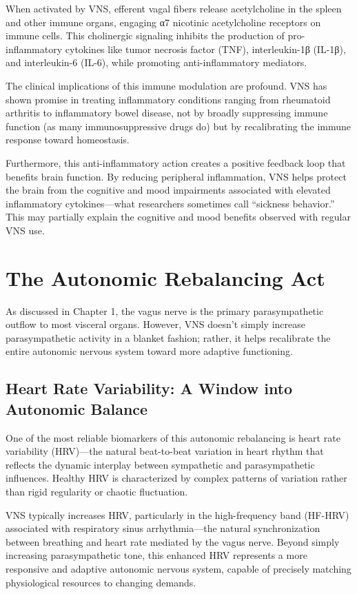 \documentclass[
  Letterpaper,
]{scrbook}
\begin{document}
When activated by VNS, efferent vagal fibers release acetylcholine in
the spleen and other immune organs, engaging α7 nicotinic acetylcholine
receptors on immune cells. This cholinergic signaling inhibits the
production of pro-inflammatory cytokines like tumor necrosis factor
(TNF), interleukin-1β (IL-1β), and interleukin-6 (IL-6), while promoting
anti-inflammatory mediators.

The clinical implications of this immune modulation are profound. VNS
has shown promise in treating inflammatory conditions ranging from
rheumatoid arthritis to inflammatory bowel disease, not by broadly
suppressing immune function (as many immunosuppressive drugs do) but by
recalibrating the immune response toward homeostasis.

Furthermore, this anti-inflammatory action creates a positive feedback
loop that benefits brain function. By reducing peripheral inflammation,
VNS helps protect the brain from the cognitive and mood impairments
associated with elevated inflammatory cytokines---what researchers
sometimes call ``sickness behavior.'' This may partially explain the
cognitive and mood benefits observed with regular VNS use.

\section{The Autonomic Rebalancing
Act}\label{the-autonomic-rebalancing-act}

As discussed in Chapter 1, the vagus nerve is the primary
parasympathetic outflow to most visceral organs. However, VNS doesn't
simply increase parasympathetic activity in a blanket fashion; rather,
it helps recalibrate the entire autonomic nervous system toward more
adaptive functioning.

\subsection{Heart Rate Variability: A Window into Autonomic
Balance}\label{heart-rate-variability-a-window-into-autonomic-balance}

One of the most reliable biomarkers of this autonomic rebalancing is
heart rate variability (HRV)---the natural beat-to-beat variation in
heart rhythm that reflects the dynamic interplay between sympathetic and
parasympathetic influences. Healthy HRV is characterized by complex
patterns of variation rather than rigid regularity or chaotic
fluctuation.

VNS typically increases HRV, particularly in the high-frequency band
(HF-HRV) associated with respiratory sinus arrhythmia---the natural
synchronization between breathing and heart rate mediated by the vagus
nerve. Beyond simply increasing parasympathetic tone, this enhanced HRV
represents a more responsive and adaptive autonomic nervous system,
capable of precisely matching physiological resources to changing
demands.
\end{document}
